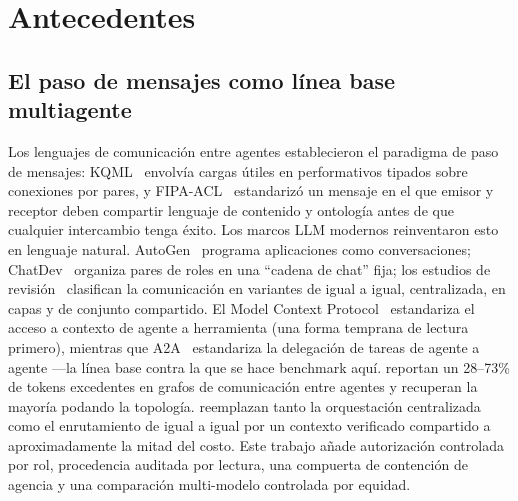 \documentclass[conference,letterpaper]{IEEEtran}
\begin{document}
\section{Antecedentes}
\label{sec:related}

\subsection{El paso de mensajes como l\'inea base multiagente}
Los lenguajes de comunicaci\'on entre agentes establecieron el paradigma de paso de mensajes:
KQML~\citep{finin1994} envolv\'ia cargas \'utiles en performativos tipados sobre conexiones por
pares, y FIPA-ACL~\citep{fipa2002} estandariz\'o un mensaje en el que emisor y receptor deben
compartir lenguaje de contenido y ontolog\'ia antes de que cualquier intercambio tenga \'exito. Los
marcos LLM modernos reinventaron esto en lenguaje natural. AutoGen~\citep{wu2023autogen} programa
aplicaciones como conversaciones; ChatDev~\citep{qian2024chatdev} organiza pares de roles en una
``cadena de chat'' fija; los estudios de revisi\'on~\citep{guo2024survey} clasifican la comunicaci\'on
en variantes de igual a igual, centralizada, en capas y de conjunto compartido. El Model Context
Protocol~\citep{mcp2024} estandariza el acceso a contexto de agente a herramienta (una forma temprana
de lectura primero), mientras que A2A~\citep{a2a2025} estandariza la delegaci\'on de tareas de agente
a agente ---la l\'inea base contra la que se hace benchmark aqu\'i. \citet{zhang2024agentprune}
reportan un 28--73\% de tokens excedentes en grafos de comunicaci\'on entre agentes y recuperan la
mayor\'ia podando la topolog\'ia. \citet{mao2026delm} reemplazan tanto la orquestaci\'on centralizada
como el enrutamiento de igual a igual por un contexto verificado compartido a aproximadamente la
mitad del costo. Este trabajo a\~nade autorizaci\'on controlada por rol, procedencia auditada por
lectura, una compuerta de contenci\'on de agencia y una comparaci\'on multi-modelo controlada por
equidad.
\end{document}
